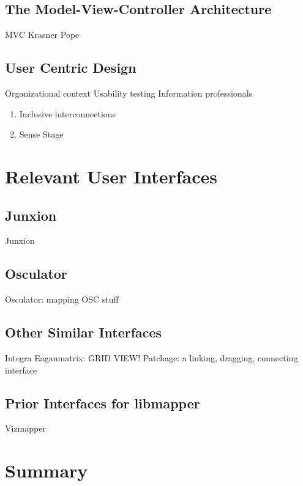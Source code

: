 	\subsection{The Model-View-Controller Architecture}
		MVC Krasner Pope 
	\subsection{User Centric Design}
		Organizational context 
		Usability testing 
		Information professionals 
	\begin{enumerate}
		\item Inclusive interconnections 
		\item Sense Stage 
	\end{enumerate}

\section{Relevant User Interfaces}
	\subsection{Junxion}
		Junxion 
	\subsection{Osculator}
		Osculator: mapping OSC stuff 
	\subsection{Other Similar Interfaces}
		Integra 
		Eaganmatrix: GRID VIEW! 
		Patchage: a linking, dragging, connecting interface 
	\subsection{Prior Interfaces for libmapper} \label{sec:priorGUIs}
		Vizmapper 
	

\section{Summary}
	